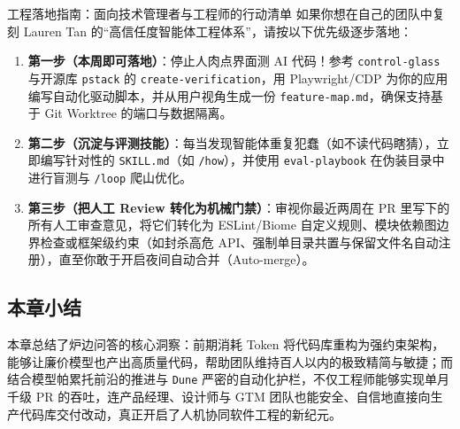 \documentclass[a4paper]{article}
\begin{document}
\begin{practicebox}{工程落地指南：面向技术管理者与工程师的行动清单}
如果你想在自己的团队中复刻 Lauren Tan 的“高信任度智能体工程体系”，请按以下优先级逐步落地：
\begin{enumerate}
  \item \textbf{第一步（本周即可落地）}：停止人肉点界面测 AI 代码！参考 \texttt{control-glass} 与开源库 \texttt{pstack} 的 \texttt{create-verification}，用 Playwright/CDP 为你的应用编写自动化驱动脚本，并从用户视角生成一份 \texttt{feature-map.md}，确保支持基于 Git Worktree 的端口与数据隔离。
  \item \textbf{第二步（沉淀与评测技能）}：每当发现智能体重复犯蠢（如不读代码瞎猜），立即编写针对性的 \texttt{SKILL.md}（如 \texttt{/how}），并使用 \texttt{eval-playbook} 在伪装目录中进行盲测与 \texttt{/loop} 爬山优化。
  \item \textbf{第三步（把人工 Review 转化为机械门禁）}：审视你最近两周在 PR 里写下的所有人工审查意见，将它们转化为 ESLint/Biome 自定义规则、模块依赖图边界检查或框架级约束（如封杀高危 API、强制单目录共置与保留文件名自动注册），直至你敢于开启夜间自动合并（Auto-merge）。
\end{enumerate}
\end{practicebox}

\subsection{本章小结}

本章总结了炉边问答的核心洞察：前期消耗 Token 将代码库重构为强约束架构，能够让廉价模型也产出高质量代码，帮助团队维持百人以内的极致精简与敏捷；而结合模型帕累托前沿的推进与 \texttt{Dune} 严密的自动化护栏，不仅工程师能够实现单月千级 PR 的吞吐，连产品经理、设计师与 GTM 团队也能安全、自信地直接向生产代码库交付改动，真正开启了人机协同软件工程的新纪元。
\end{document}
